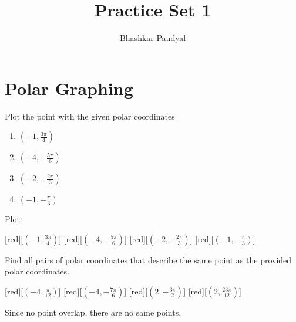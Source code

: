 \message{ !name(main.tex)}\documentclass[a4paper, margin=0.5in]{article}
\author{Bhashkar Paudyal}
\title{Practice Set 1}
\begin{document}

\maketitle
\newpage

\tableofcontents{}
\newpage

\section{Polar Graphing}
\label{sec:polar-graphing}

\begin{problem}
  Plot the point with the given polar coordinates

  \begin{enumerate}
    \item \((-1,\frac{3\pi}{4})\)
    \item \((-4, -\frac{5\pi}{6})\)
    \item \((-2, -\frac{2\pi}{3})\)
    \item \((-1, -\frac{\pi}{3})\)
  \end{enumerate}

  \begin{solution}
    Plot:\\
    \begin{polargrid}[5][5][12][5.5]
      [red][\((-1,\frac{3\pi}{4})\)]
      [red][\((-4,-\frac{5\pi}{6})\)]
      [red][\((-2,-\frac{2\pi}{3})\)]
      [red][\((-1,-\frac{\pi}{3})\)]
    \end{polargrid}
  \end{solution}
\end{problem}

\newpage

\begin{problem}
  Find all pairs of polar coordinates that describe the same point as the
  provided polar coordinates.\\
  \begin{polargrid}[4][4][24][4.5]
    [red][\((-4,\frac{\pi}{12})\)]
    [red][\((-4,-\frac{7\pi}{6})\)]
    [red][\((2,-\frac{3\pi}{2})\)]
    [red][\((2,\frac{23\pi}{12})\)]
  \end{polargrid}

  \begin{solution}
    Since no point overlap, there are no same points.
  \end{solution}

\end{problem}
\end{document}
